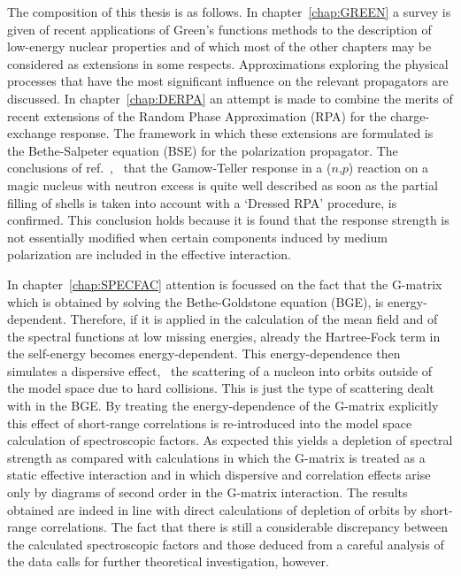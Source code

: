 The composition of this thesis is as follows. In chapter~\ref{chap:GREEN}
a survey is given 
of recent applications of Green's functions methods to the description of 
low-energy nuclear properties and of which most of the other chapters may be 
considered as extensions in some respects. Approximations exploring the 
physical processes that have the most significant influence on 
the relevant propagators are discussed. In chapter~\ref{chap:DERPA}
an attempt is made to combine 
the merits of recent extensions \cite{BAD90,RGBA93} of the 
Random Phase Approximation 
(RPA) for the charge-exchange  response. The framework in which these 
extensions are formulated is the
 Bethe-Salpeter equation (BSE) for the polarization propagator. 
The conclusions of ref.~\cite{RGBA93}, \viz\ that the Gamow-Teller response 
in a ($n$,$p$) reaction on a magic nucleus with neutron excess is 
quite well described 
as soon as the partial filling of shells is taken into account with 
a `Dressed RPA' procedure, is confirmed. This conclusion  holds 
because it is found that the response strength 
is not essentially modified when certain components induced 
by medium polarization are included in the effective interaction.

In chapter~\ref{chap:SPECFAC} attention is focussed on the fact that the 
G-matrix  which is obtained by solving the Bethe-Goldstone equation 
(BGE)\cite{MS93a}, is energy-dependent. Therefore, if it is applied in the 
calculation of the mean field and of the spectral functions at low missing 
energies, already the Hartree-Fock term in the self-energy becomes 
energy-dependent. 
This energy-dependence then simulates a dispersive effect, \viz\ 
the scattering of a nucleon into orbits outside of 
the model space due to hard collisions. This is just the type of scattering 
dealt with in the BGE.
By treating the energy-dependence of the G-matrix explicitly this effect 
of short-range correlations is re-introduced into the model space calculation 
of spectroscopic factors. As expected this yields a depletion of spectral 
strength as compared with calculations in which the G-matrix is treated as a 
static effective interaction and in which dispersive and correlation effects 
arise only by diagrams of second order in the G-matrix interaction.
The results obtained are indeed in line with direct calculations of depletion 
of orbits by short-range correlations\cite{MPD95}. The fact that there is 
still a considerable discrepancy between the calculated spectroscopic factors 
and those deduced from a careful analysis of the data \cite{Leu94} calls for 
further theoretical investigation, however.

